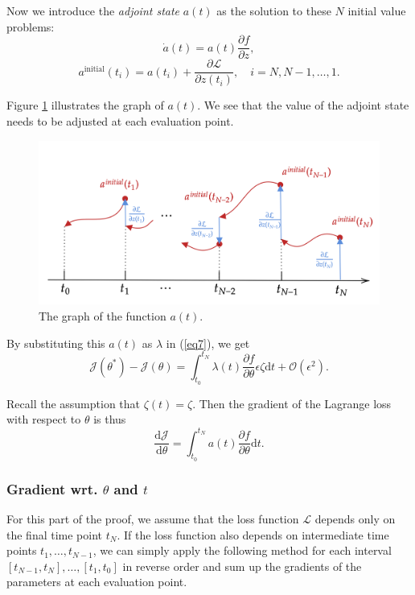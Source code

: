 \documentclass[a4paper,11pt,titlepage]{article}
\theoremstyle{definition}
\theoremstyle{plain}
\theoremstyle{remark}
\begin{document}
Now we introduce the \textit{adjoint state} $a(t)$ as the solution to these $N$ initial value problems:
\begin{equation}
\dot{a}(t)=a(t)\frac{\partial f}{\partial z},
\label{eq7}
\end{equation}
$$ a^{\mathrm{initial}}
(t_i)=a(t_i)+\frac{\partial\mathcal{L}}{\partial z(t_i)}, \quad i=N,N-1,\dots,1.$$

Figure \ref{fig:graphat} illustrates the graph of $a(t)$. We see that the value of the adjoint state needs to be adjusted at each evaluation point.

\begin{figure}[htbp]
\label{fig9}
    \centering
    \includegraphics[width=0.75\linewidth]{report/figures/BackpropODE.png}
    \caption{The graph of the function $a(t)$.}
    \label{fig:graphat}
\end{figure}

By substituting this $a(t)$ as $\lambda$ in (\ref{eq7}), we get
$$
\mathcal{J}(\theta^*)-\mathcal{J}(\theta)=\int^{t_N}_{t_0}\lambda(t)\frac{\partial f}{\partial \theta}\epsilon\zeta\mathrm{d}t+\mathcal{O}(\epsilon^2).
$$

Recall the assumption that $\zeta(t)=\zeta$. Then the gradient of the Lagrange loss with respect to $\theta$ is thus
$$
\frac{\mathrm{d}\mathcal{J}}{\mathrm{d}\theta}=\int^{t_N}_{t_0}a(t)\frac{\partial f}{\partial \theta}\mathrm{d}t.
$$

\subsubsection{Gradient wrt. \(\theta\) and \(t\)}

For this part of the proof, we assume that the loss function $\mathcal{L}$ depends only on the final time point $t_N$. If the loss function also depends on intermediate time points $t_1,\dots,t_{N-1}$, we can simply apply the following method for each interval $[t_{N-1},t_N],\dots,[t_1,t_0]$ in reverse order and sum up the gradients of the parameters at each evaluation point.
\end{document}

